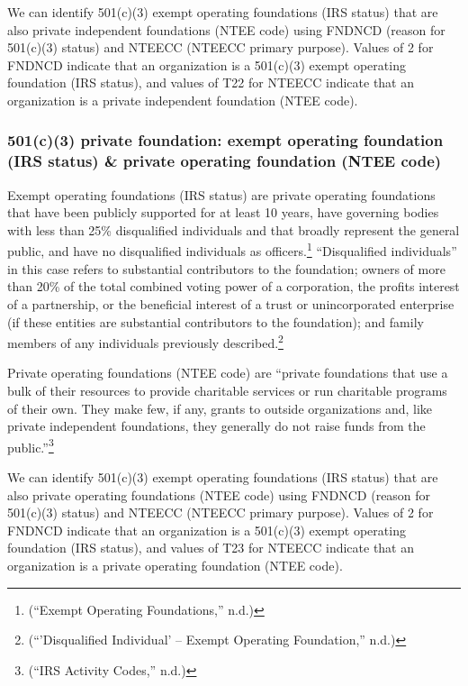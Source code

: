 \documentclass[
  letterpaper,
  DIV=11,
  numbers=noendperiod]{scrreprt}
\begin{document}
We can identify 501(c)(3) exempt operating foundations (IRS status) that
are also private independent foundations (NTEE code) using FNDNCD
(reason for 501(c)(3) status) and NTEECC (NTEECC primary purpose).
Values of 2 for FNDNCD indicate that an organization is a 501(c)(3)
exempt operating foundation (IRS status), and values of T22 for NTEECC
indicate that an organization is a private independent foundation (NTEE
code).

\hypertarget{c3-private-foundation-exempt-operating-foundation-irs-status-private-operating-foundation-ntee-code}{%
\subsubsection{501(c)(3) private foundation: exempt operating foundation
(IRS status) \& private operating foundation (NTEE
code)}\label{c3-private-foundation-exempt-operating-foundation-irs-status-private-operating-foundation-ntee-code}}

Exempt operating foundations (IRS status) are private operating
foundations that have been publicly supported for at least 10 years,
have governing bodies with less than 25\% disqualified individuals and
that broadly represent the general public, and have no disqualified
individuals as officers.\footnote{({``Exempt Operating Foundations,''}
  n.d.)} ``Disqualified individuals'' in this case refers to substantial
contributors to the foundation; owners of more than 20\% of the total
combined voting power of a corporation, the profits interest of a
partnership, or the beneficial interest of a trust or unincorporated
enterprise (if these entities are substantial contributors to the
foundation); and family members of any individuals previously
described.\footnote{({``'Disqualified Individual' -- Exempt Operating
  Foundation,''} n.d.)}

Private operating foundations (NTEE code) are ``private foundations that
use a bulk of their resources to provide charitable services or run
charitable programs of their own. They make few, if any, grants to
outside organizations and, like private independent foundations, they
generally do not raise funds from the public.''\footnote{({``IRS
  Activity Codes,''} n.d.)}

We can identify 501(c)(3) exempt operating foundations (IRS status) that
are also private operating foundations (NTEE code) using FNDNCD (reason
for 501(c)(3) status) and NTEECC (NTEECC primary purpose). Values of 2
for FNDNCD indicate that an organization is a 501(c)(3) exempt operating
foundation (IRS status), and values of T23 for NTEECC indicate that an
organization is a private operating foundation (NTEE code).
\end{document}

